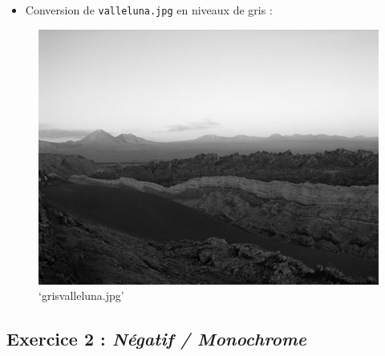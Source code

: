 \documentclass[11pt]{article}
\makeatletter
\def\maxwidth{\ifdim\Gin@nat@width>\linewidth\linewidth
    \else\Gin@nat@width\fi}
\let\Oldincludegraphics\includegraphics
\renewcommand{\includegraphics}[1]{\Oldincludegraphics[width=.8\maxwidth]{#1}}
\providecommand{\tightlist}{%
      \setlength{\itemsep}{0pt}\setlength{\parskip}{0pt}}
\makeatother
\begin{document}
    \begin{itemize}
\tightlist
\item
  Conversion de \texttt{valleluna.jpg} en niveaux de gris :
\end{itemize}

\begin{figure}
\centering
\includegraphics{grisvalleluna.jpg}
\caption{`grisvalleluna.jpg'}
\end{figure}

    \hypertarget{exercice-2-nuxe9gatif-monochrome}{%
\subsection{\texorpdfstring{Exercice 2 : \emph{Négatif /
Monochrome}}{Exercice 2 : Négatif / Monochrome}}\label{exercice-2-nuxe9gatif-monochrome}}
\end{document}
